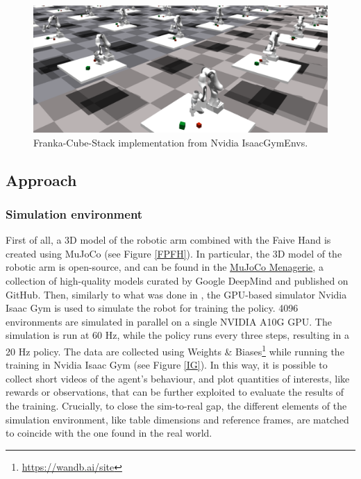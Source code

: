 \documentclass[a4paper]{article}
\begin{document}
\begin{figure}[!hb]
    \centering
    \includegraphics[scale=0.3]{images/Screenshot from 2023-10-15 20-32-34.png}
    \caption{Franka-Cube-Stack implementation from Nvidia IsaacGymEnvs.}
    \label{FCS}
\end{figure}

\subsection{Approach}

\subsubsection{Simulation environment}

First of all, a 3D model of the robotic arm combined with the Faive Hand is created using MuJoCo (see Figure \ref{FPFH}). In particular, the 3D model of the robotic arm is open-source, and can be found in the \href{https://github.com/google-deepmind/mujoco_menagerie/tree/main/franka_emika_panda}{MuJoCo Menagerie}, a collection of high-quality models curated by Google DeepMind and published on GitHub. Then, similarly to what was done in \cite{toshimitsu2023getting}, the GPU-based simulator Nvidia Isaac Gym is used to simulate the robot for training the policy. 4096 environments are simulated in parallel on a single NVIDIA A10G GPU. The simulation is run at 60 Hz, while the policy runs every three steps, resulting in a 20 Hz policy.
The data are collected using Weights \& Biases\footnote{\url{https://wandb.ai/site}} while running the training in Nvidia Isaac Gym (see Figure \ref{IG}). In this way, it is possible to collect short videos of the agent's behaviour, and plot quantities of interests, like rewards or observations, that can be further exploited to evaluate the results of the training. Crucially, to close the sim-to-real gap, the different elements of the simulation environment, like table dimensions and reference frames, are matched to coincide with the one found in the real world.
\end{document}
